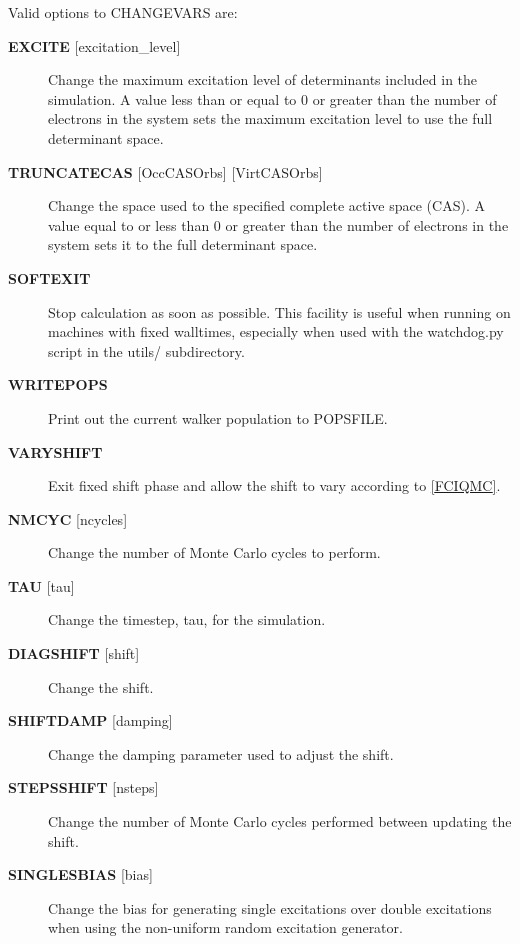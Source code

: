 \documentclass[openany,a4paper,10pt,english]{manual}
\begin{document}
Valid options to CHANGEVARS are:
\begin{description}
\item[\textbf{EXCITE} {[}excitation\_level{]}] \leavevmode
Change the maximum excitation level of determinants included in the
simulation.  A value less than or equal to 0 or greater than the number of
electrons in the system sets the maximum excitation level to use the full
determinant space.

\item[\textbf{TRUNCATECAS} {[}OccCASOrbs{]} {[}VirtCASOrbs{]}] \leavevmode
Change the space used to the specified complete active space (CAS). A value
equal to or less than 0 or greater than the number of electrons in the system
sets it to the full determinant space.

\item[\textbf{SOFTEXIT}] \leavevmode
Stop calculation as soon as possible.  This facility is useful when running
on machines with fixed walltimes, especially when used with the watchdog.py
script in the utils/ subdirectory.

\item[\textbf{WRITEPOPS}] \leavevmode
Print out the current walker population to POPSFILE.

\item[\textbf{VARYSHIFT}] \leavevmode
Exit fixed shift phase and allow the shift to vary according to \hyperlink{fciqmc}{{[}FCIQMC{]}}.

\item[\textbf{NMCYC} {[}ncycles{]}] \leavevmode
Change the number of Monte Carlo cycles to perform.

\item[\textbf{TAU} {[}tau{]}] \leavevmode
Change the timestep, tau, for the simulation.

\item[\textbf{DIAGSHIFT} {[}shift{]}] \leavevmode
Change the shift.

\item[\textbf{SHIFTDAMP} {[}damping{]}] \leavevmode
Change the damping parameter used to adjust the shift.

\item[\textbf{STEPSSHIFT} {[}nsteps{]}] \leavevmode
Change the number of Monte Carlo cycles performed between updating the shift.

\item[\textbf{SINGLESBIAS} {[}bias{]}] \leavevmode
Change the bias for generating single excitations over double excitations
when using the non-uniform random excitation generator.


\end{description}
\end{document}
